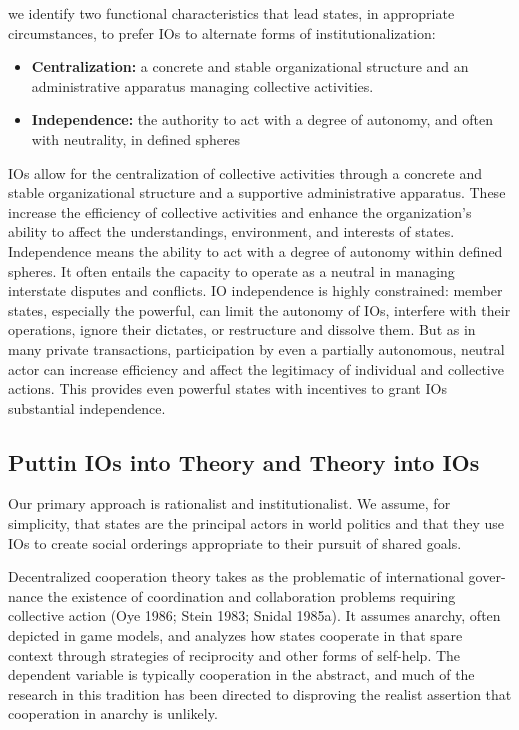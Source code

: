we identify two functional characteristics that lead states, in appropriate circumstances, to prefer IOs to alternate forms of institutionalization:
\begin{itemize}
    \item \textbf{Centralization:} a concrete and stable organizational structure and an administrative apparatus managing collective activities.
    \item \textbf{Independence:} the authority to act with a degree of autonomy, and often with neutrality, in defined spheres
\end{itemize}

IOs allow for the centralization of collective activities through a concrete and stable organizational structure and a supportive administrative apparatus. These increase the efficiency of collective activities and enhance the organization's ability to affect the understandings, environment, and interests of states. Independence means the ability to act with a degree of autonomy within defined spheres. It often entails the capacity to operate as a neutral in managing interstate disputes and conflicts. IO independence is highly constrained: member states, especially the powerful, can limit the autonomy of IOs, interfere with their operations, ignore their dictates, or restructure and dissolve them. But as in many private transactions, participation by even a partially autonomous, neutral actor can increase efficiency and affect the legitimacy of individual and collective actions. This provides even powerful states with incentives to grant IOs substantial independence.

\subsection{Puttin IOs into Theory and Theory into IOs}
Our primary approach is rationalist and institutionalist. We assume, for simplicity, that states are the principal actors in world politics and that they use IOs to create social orderings appropriate to their pursuit of shared goals.

Decentralized cooperation theory takes as the problematic of international gover-
nance the existence of coordination and collaboration problems requiring collective
action (Oye 1986; Stein 1983; Snidal 1985a). It assumes anarchy, often depicted in
game models, and analyzes how states cooperate in that spare context through
strategies of reciprocity and other forms of self-help. The dependent variable is
typically cooperation in the abstract, and much of the research in this tradition has been
directed to disproving the realist assertion that cooperation in anarchy is unlikely.

